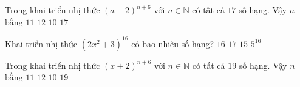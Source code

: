 \begin{ex}%
	Trong khai triển nhị thức $(a+2)^{n+6}$ với $n\in\mathbb{N}$ có tất cả $17$ số hạng. Vậy $n$ bằng
	\choice
	{$ 11 $}
	{$ 12 $}
	{\True $ 10 $}
	{$ 17 $}
\end{ex}%
\begin{ex}%
	Khai triển nhị thức $\left(2x^2+3\right)^{16}$ có bao nhiêu số hạng? 
	\choice
	{ $16$}
	{\True  $17$}
	{ $15$}
	{$5^{16}$}
\end{ex}%
\begin{ex}%
	Trong khai triển nhị thức $(x+2)^{n+6}$ với $n\in\mathbb{N}$ có tất cả $19$ số hạng. Vậy $n$ bằng
	\choice
	{$ 11 $}
	{\True $ 12 $}
	{$ 10 $}
	{$ 19 $}
\end{ex}